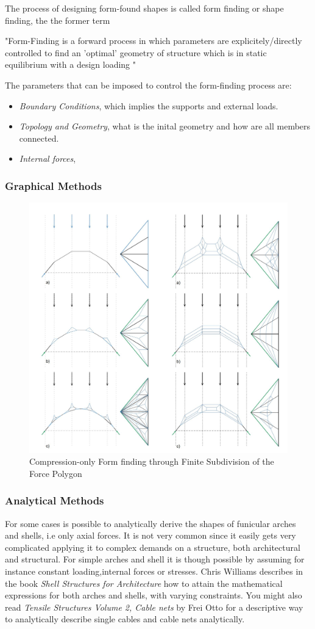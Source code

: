 The process of designing form-found shapes is called form finding or shape finding, the the former term

"Form-Finding is a forward process in which parameters are explicitely/directly controlled to find an 'optimal' geometry of structure which is in static equilibrium with a design loading "

The parameters that can be imposed to control the form-finding process are:

\begin{itemize}
\item \textit{Boundary Conditions}, which implies the supports and external loads.
\item \textit{Topology and Geometry}, what is the inital geometry and how are all members connected.
\item \textit{Internal forces}, 
\end{itemize}


\subsubsection{Graphical Methods}




\begin{figure}[H]
\centering
\includegraphics[width=0.6\linewidth ]{figure/Theory/graphStatEx.JPG}
\caption{Compression-only Form finding through Finite Subdivision of the
Force Polygon }
\end{figure}


\subsubsection{Analytical Methods}

For some cases is possible to analytically derive the shapes of funicular arches and shells, i.e only axial forces. It is not very common since it easily gets very complicated applying it to complex demands on a structure, both architectural and structural. For simple arches and shell it is though possible by assuming for instance constant loading,internal forces or stresses.  Chris Williams describes in the book \textit{Shell Structures for Architecture} how to attain the mathematical expressions for both arches and shells, with varying constraints.
You might also read \textit{ Tensile Structures Volume 2,  Cable nets} by Frei Otto for a descriptive way to analytically describe single cables and cable nets analytically. 

